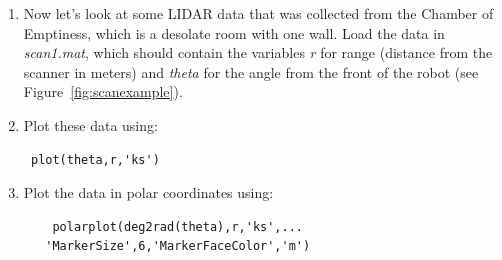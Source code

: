 \documentclass[M3_Night5_Solutions]{subfiles}
\begin{document}
\begin{enumerate}[resume=exercises, label=\textbf{Exercise} (\arabic*)]
\item Now let's look at some LIDAR data that was collected from the Chamber of Emptiness\texttrademark, which is a desolate room with one wall. Load the data in \textit{scan1.mat}, which should contain the variables \textit{r} for range (distance from the scanner in meters) and \textit{theta} for the angle from the front of the robot (see Figure~\ref{fig:scanexample}).
\be
\item Plot these data using: \begin{verbatim} plot(theta,r,'ks')\end{verbatim}

\item Plot the data in polar coordinates using:
\begin{verbatim}	polarplot(deg2rad(theta),r,'ks',...
   'MarkerSize',6,'MarkerFaceColor','m')
\end{verbatim}



\end{enumerate}
\end{document}
